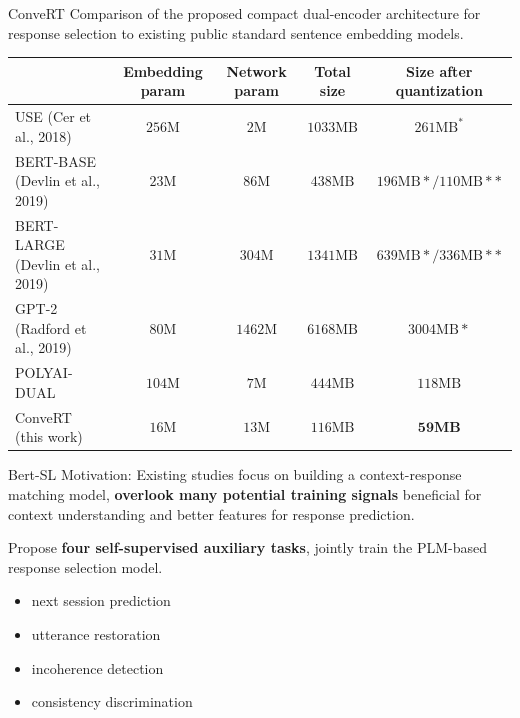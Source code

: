 \documentclass{beamer}
\begin{document}
\begin{frame}{ConveRT}
Comparison of the proposed compact dual-encoder architecture for response selection to existing public standard sentence embedding models.
\begin{center} \tiny

    \begin{tabular}{lcccc}
\hline & Embedding param & Network param & Total size & Size after quantization \\
\hline USE (Cer et al., 2018) & $256 \mathrm{M}$ & $2 \mathrm{M}$ & $1033 \mathrm{MB}$ & $261 \mathrm{MB}^{*}$ \\
BERT-BASE (Devlin et al., 2019) & $23 \mathrm{M}$ & $86 \mathrm{M}$ & $438 \mathrm{MB}$ & $196 \mathrm{MB} * / 110 \mathrm{MB} * *$ \\
BERT-LARGE (Devlin et al., 2019) & $31 \mathrm{M}$ & $304 \mathrm{M}$ & $1341 \mathrm{MB}$ & $639 \mathrm{MB} * / 336 \mathrm{MB} * *$ \\
GPT-2 (Radford et al., 2019) & $80 \mathrm{M}$ & $1462 \mathrm{M}$ & $6168 \mathrm{MB}$ & $3004 \mathrm{MB} *$ \\
POLYAI-DUAL & $104 \mathrm{M}$ & $7 \mathrm{M}$ & $444 \mathrm{MB}$ & $118 \mathrm{MB}$ \\
\hline ConveRT (this work) & $16 \mathrm{M}$ & $13 \mathrm{M}$ & $116 \mathrm{MB}$ & $\mathbf{5 9 M B}$ \\
\hline
\end{tabular}
    
\end{center}
\end{frame}

\begin{frame}{Bert-SL}
Motivation: Existing studies focus on building a context-response matching model, \textbf{overlook many potential training signals} beneficial for context understanding and better features for response prediction.

Propose \textbf{four self-supervised auxiliary tasks}, jointly train the PLM-based response selection model.
    \begin{itemize}
        \item next session prediction
        \item utterance restoration
        \item incoherence detection
        \item consistency discrimination
    \end{itemize}
\end{frame}
\end{document}

